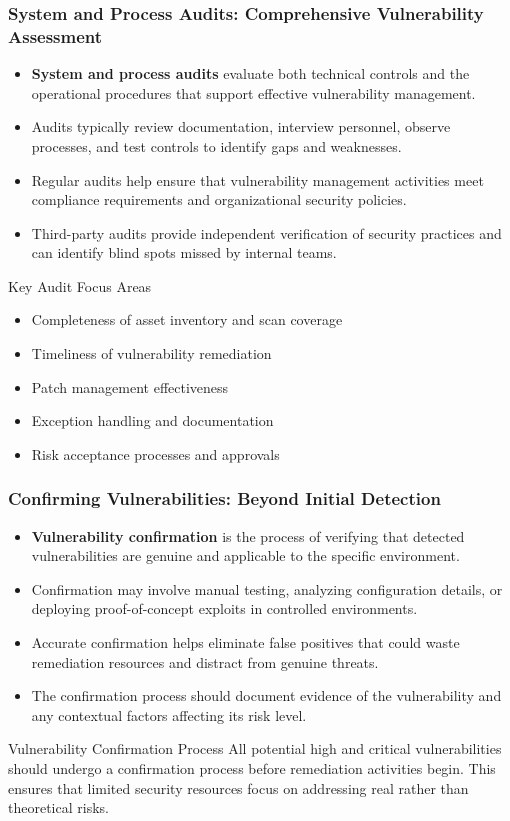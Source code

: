 \documentclass{beamer}
\begin{document}
\begin{frame}
\frametitle{System and Process Audits: Comprehensive Vulnerability Assessment}
\begin{itemize}
\item \textbf{System and process audits} evaluate both technical controls and the operational procedures that support effective vulnerability management.
\item Audits typically review documentation, interview personnel, observe processes, and test controls to identify gaps and weaknesses.
\item Regular audits help ensure that vulnerability management activities meet compliance requirements and organizational security policies.
\item Third-party audits provide independent verification of security practices and can identify blind spots missed by internal teams.
\end{itemize}

\begin{block}{Key Audit Focus Areas}
\scriptsize
\begin{itemize}
\item Completeness of asset inventory and scan coverage
\item Timeliness of vulnerability remediation
\item Patch management effectiveness
\item Exception handling and documentation
\item Risk acceptance processes and approvals
\end{itemize}
\end{block}
\end{frame}

\begin{frame}
\frametitle{Confirming Vulnerabilities: Beyond Initial Detection}
\begin{itemize}
\item \textbf{Vulnerability confirmation} is the process of verifying that detected vulnerabilities are genuine and applicable to the specific environment.
\item Confirmation may involve manual testing, analyzing configuration details, or deploying proof-of-concept exploits in controlled environments.
\item Accurate confirmation helps eliminate false positives that could waste remediation resources and distract from genuine threats.
\item The confirmation process should document evidence of the vulnerability and any contextual factors affecting its risk level.
\end{itemize}

\begin{alertblock}{Vulnerability Confirmation Process}
\scriptsize
All potential high and critical vulnerabilities should undergo a confirmation process before remediation activities begin. This ensures that limited security resources focus on addressing real rather than theoretical risks.
\end{alertblock}
\end{frame}
\end{document}
